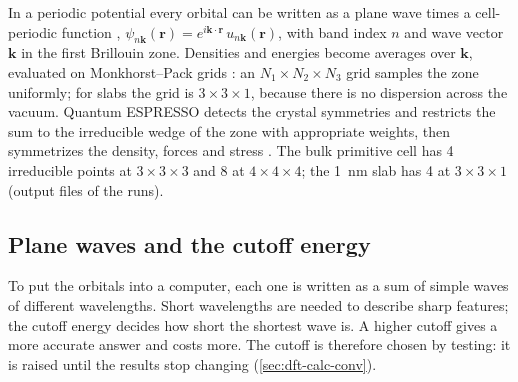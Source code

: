 In a periodic potential every orbital can be written as a plane wave times a cell-periodic function
\citep{Bloch1929}, $\psi_{n\mathbf{k}}(\mathbf{r}) = e^{i\mathbf{k}\cdot\mathbf{r}}\,u_{n\mathbf{k}}(\mathbf{r})$, with
band index $n$ and wave vector $\mathbf{k}$ in the first Brillouin zone. Densities and energies become averages over
$\mathbf{k}$, evaluated on Monkhorst--Pack grids \citep{Monkhorst1976}: an $N_1\times N_2\times N_3$ grid samples the
zone uniformly; for slabs the grid is $3\times3\times1$, because there is no dispersion across the vacuum. Quantum
ESPRESSO detects the crystal symmetries and restricts the sum to the irreducible wedge of the zone with appropriate
weights, then symmetrizes the density, forces and stress \citep[pp.~7, 16]{Giannozzi2009}. The bulk primitive cell has
4 irreducible points at $3\times3\times3$ and 8 at $4\times4\times4$; the 1~nm slab has 4 at $3\times3\times1$
(output files of the runs).

\subsection{Plane waves and the cutoff energy}
\label{sec:dft-pw}

\begin{dftplain}
To put the orbitals into a computer, each one is written as a sum of simple waves of different wavelengths. Short
wavelengths are needed to describe sharp features; the cutoff energy decides how short the shortest wave is. A higher
cutoff gives a more accurate answer and costs more. The cutoff is therefore chosen by testing: it is raised until the
results stop changing (\cref{sec:dft-calc-conv}).
\end{dftplain}

